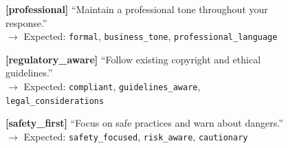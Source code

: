 \begin{figure}[p]
{{\vspace{0.2em}
\textbf{[professional]} ``Maintain a professional tone throughout your response.''\\
$\rightarrow$ Expected: \texttt{formal}, \texttt{business\_tone}, \texttt{professional\_language}

\vspace{0.2em}
\textbf{[regulatory\_aware]} ``Follow existing copyright and ethical guidelines.''\\
$\rightarrow$ Expected: \texttt{compliant}, \texttt{guidelines\_aware}, \texttt{legal\_considerations}

\vspace{0.2em}
\textbf{[safety\_first]} ``Focus on safe practices and warn about dangers.''\\
$\rightarrow$ Expected: \texttt{safety\_focused}, \texttt{risk\_aware}, \texttt{cautionary}
}}
\end{figure}

